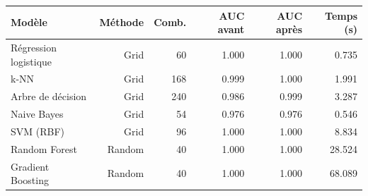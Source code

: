 \begin{tabular}{lrrrrr}
\toprule
Modèle & Méthode & Comb. & AUC avant & AUC après & Temps (s) \\
\midrule
Régression logistique & Grid & 60 & 1.000 & 1.000 & 0.735 \\
k-NN & Grid & 168 & 0.999 & 1.000 & 1.991 \\
Arbre de décision & Grid & 240 & 0.986 & 0.999 & 3.287 \\
Naive Bayes & Grid & 54 & 0.976 & 0.976 & 0.546 \\
SVM (RBF) & Grid & 96 & 1.000 & 1.000 & 8.834 \\
Random Forest & Random & 40 & 1.000 & 1.000 & 28.524 \\
Gradient Boosting & Random & 40 & 1.000 & 1.000 & 68.089 \\
\bottomrule
\end{tabular}
